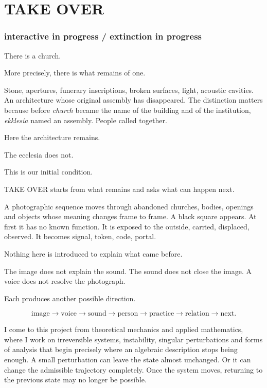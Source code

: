 \section{TAKE OVER}\label{take-over}

\subsubsection{interactive in progress / extinction in
progress}\label{interactive-in-progress-extinction-in-progress}

There is a church.

More precisely, there is what remains of one.

Stone, apertures, funerary inscriptions, broken surfaces, light,
acoustic cavities. An architecture whose original assembly has
disappeared. The distinction matters because before \emph{church} became
the name of the building and of the institution, \emph{ekklesía} named
an assembly. People called together.

Here the architecture remains.

The ecclesia does not.

This is our initial condition.

TAKE OVER starts from what remains and asks what can happen next.

A photographic sequence moves through abandoned churches, bodies,
openings and objects whose meaning changes frame to frame. A black
square appears. At first it has no known function. It is exposed to the
outside, carried, displaced, observed. It becomes signal, token, code,
portal.

Nothing here is introduced to explain what came before.

The image does not explain the sound. The sound does not close the
image. A voice does not resolve the photograph.

Each produces another possible direction.

\[
\text{image}\rightarrow\text{voice}\rightarrow\text{sound}
\rightarrow\text{person}\rightarrow\text{practice}
\rightarrow\text{relation}\rightarrow\text{next}.
\]

I come to this project from theoretical mechanics and applied
mathematics, where I work on irreversible systems, instability, singular
perturbations and forms of analysis that begin precisely where an
algebraic description stops being enough. A small perturbation can leave
the state almost unchanged. Or it can change the admissible trajectory
completely. Once the system moves, returning to the previous state may
no longer be possible.

